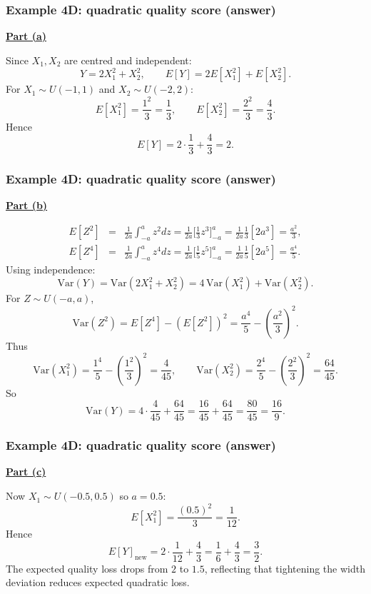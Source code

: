 \documentclass[t,8pt]{beamer}
\begin{document}
\begin{frame}
	\frametitle{Example 4D: quadratic quality score (answer)}
	{\bf\underline{Part (a)}} \par
	Since $X_1,X_2$ are centred and independent:
	\[
	Y = 2X_1^2 + X_2^2, \qquad
	E[Y] = 2E[X_1^2] + E[X_2^2].
	\]
	For $X_1 \sim U(-1,1)$ and $X_2 \sim U(-2,2)$:
	\[
	E[X_1^2] = \frac{1^2}{3} = \frac{1}{3}, \qquad
	E[X_2^2] = \frac{2^2}{3} = \frac{4}{3}.
	\]
	Hence
	\[
	E[Y] = 2 \cdot \frac{1}{3} + \frac{4}{3} = 2.
	\]
\end{frame}

\begin{frame}
	\frametitle{Example 4D: quadratic quality score (answer)}
	{\bf\underline{Part (b)}} \par
	\begin{eqnarray}
		E[Z^2]&=&\frac 1{2a}\int_{-a}^az^2dz=\frac 1{2a}\big[\frac 13z^3]_{-a}^a=\frac 1{2a}\frac 13[2a^3]=\frac {a^2}3, \nonumber\\
		E[Z^4]&=&\frac 1{2a}\int_{-a}^az^4dz=\frac 1{2a}\big[\frac 15z^5]_{-a}^a=\frac 1{2a}\frac 15[2a^5]=\frac {a^4}5. \nonumber
	\end{eqnarray}
	Using independence:
	\[
	\mathrm{Var}(Y) = \mathrm{Var}(2X_1^2 + X_2^2)
	= 4\,\mathrm{Var}(X_1^2) + \mathrm{Var}(X_2^2).
	\]
	For $Z \sim U(-a,a)$,
	\[
	\mathrm{Var}(Z^2) = E[Z^4] - (E[Z^2])^2
	= \frac{a^4}{5} - \left(\frac{a^2}{3}\right)^2.
	\]
	Thus
	\[
	\mathrm{Var}(X_1^2)
	= \frac{1^4}{5} - \left(\frac{1^2}{3}\right)^2
	= \frac{4}{45}, \qquad
	\mathrm{Var}(X_2^2)
	= \frac{2^4}{5} - \left(\frac{2^2}{3}\right)^2
	= \frac{64}{45}.
	\]
	So
	\[
	\mathrm{Var}(Y)
	= 4 \cdot \frac{4}{45} + \frac{64}{45}
	= \frac{16}{45} + \frac{64}{45}
	= \frac{80}{45}
	= \frac{16}{9}.
	\]
\end{frame}

\begin{frame}
	\frametitle{Example 4D: quadratic quality score (answer)}
	{\bf\underline{Part (c)}} \par
	Now $X_1 \sim U(-0.5,0.5)$ so $a = 0.5$:
	\[
	E[X_1^2] = \frac{(0.5)^2}{3} = \frac{1}{12}.
	\]
	Hence
	\[
	E[Y]_{\text{new}} = 2 \cdot \frac{1}{12} + \frac{4}{3}
	= \frac{1}{6} + \frac{4}{3}
	= \frac{3}{2}.
	\]
	The expected quality loss drops from $2$ to $1.5$, reflecting that tightening the width deviation reduces expected quadratic loss.
\end{frame}
\end{document}
